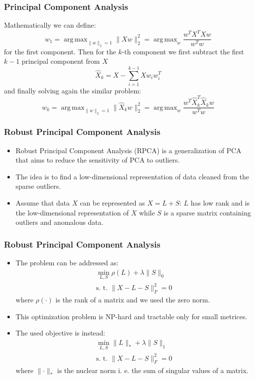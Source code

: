 \documentclass{beamer}
\theoremstyle{plain}
\theoremstyle{definition}
\theoremstyle{remark}
\newcommand{\norm}[1]{\lVert#1\rVert}
\DeclareMathOperator*{\argmax}{arg\,max}
\begin{document}
\begin{frame}
	\frametitle{Principal Component Analysis}
	Mathematically we can define:
		\begin{equation}
			w_1 = \argmax_{\norm{w}_{2}=1}{\norm{Xw}_{2}^2} = \argmax_{w}{\frac{w^TX^TXw}{w^Tw}}
		\end{equation}
		for the first component. Then for the $k$-th component we first subtract the first $k-1$ principal component from $X$
		\begin{equation}
			\hat{X}_{k} = X - \sum_{i=1}^{k-1}{Xw_{i}w_{i}^T}
		\end{equation}
		and finally solving again the similar problem:
		\begin{equation}
			w_k = \argmax_{\norm{w}_{2}=1}{\norm{\hat{X}_{k}w}_{2}^2} = \argmax_{w}{\frac{w^T\hat{X}_{k}^T\hat{X}_{k}w}{w^Tw}}
		\end{equation}
\end{frame}

\begin{frame}
	\frametitle{Robust Principal Component Analysis}
	\begin{itemize}
		\item Robust Principal Component Analysis (RPCA) is a generalization of PCA that aims to reduce the sensitivity of PCA to outliers.
		\item The idea is to find a low-dimensional representation of data cleaned from the sparse outliers.
		\item Assume that data $X$ can be represented as $X = L + S$: $L$ has low rank and is the low-dimensional representation of $X$ while $S$ is a sparse matrix containing outliers and anomalous data.
	\end{itemize}
\end{frame}

\begin{frame}
	\frametitle{Robust Principal Component Analysis}
	\begin{itemize}
		\item The problem can be addressed as:
			\begin{align}
				\min_{L,S}{\rho(L)+\lambda \norm{S}_{0}}\\
				\text{s. t. }\norm{X - L - S}_{F}^2=0 
			\end{align}
			where $\rho(\cdot)$ is the rank of a matrix and we used the zero norm.
		\item This optimization problem is NP-hard and tractable only for small metrices.
		\item The used objective is instead:
			\begin{align}
				\min_{L,S}{\norm{L}_{*}+\lambda \norm{S}_{1}}\\
				\text{s. t. }\norm{X - L - S}_F^2=0
			\end{align}
			where $\norm{\cdot}_*$ is the nuclear norm i. e. the sum of singular values of a matrix.
	\end{itemize}
\end{frame}
\end{document}
